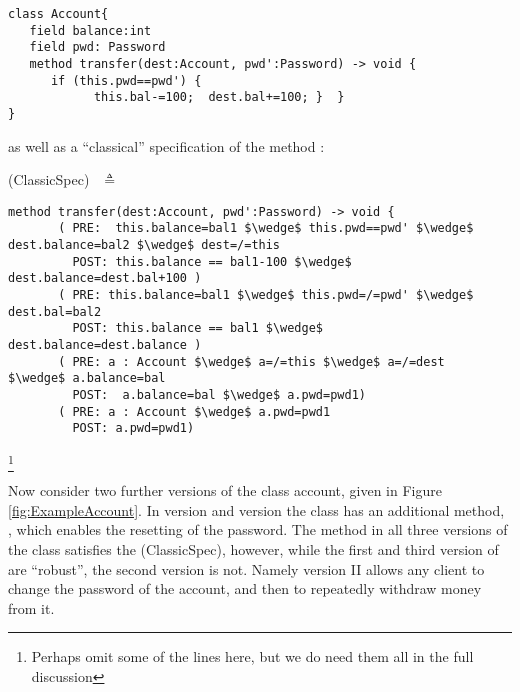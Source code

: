  

\begin{lstlisting}
class Account{
   field balance:int 
   field pwd: Password 
   method transfer(dest:Account, pwd':Password) -> void {
      if (this.pwd==pwd') {
            this.bal-=100;  dest.bal+=100; }  }
}
\end{lstlisting}

as well as a ``classical'' specification of the method :

 (ClassicSpec)$  \ \ $  $\triangleq$

\begin{lstlisting}[mathescape=true, frame=lines]
  method transfer(dest:Account, pwd':Password) -> void {
       ( PRE:  this.balance=bal1 $\wedge$ this.pwd==pwd' $\wedge$ dest.balance=bal2 $\wedge$ dest=/=this 
         POST: this.balance == bal1-100 $\wedge$  dest.balance=dest.bal+100 )
       ( PRE: this.balance=bal1 $\wedge$ this.pwd=/=pwd' $\wedge$ dest.bal=bal2
         POST: this.balance == bal1 $\wedge$  dest.balance=dest.balance )
       ( PRE: a : Account $\wedge$ a=/=this $\wedge$ a=/=dest  $\wedge$ a.balance=bal  
         POST:  a.balance=bal $\wedge$ a.pwd=pwd1)
       ( PRE: a : Account $\wedge$ a.pwd=pwd1  
         POST: a.pwd=pwd1)       
\end{lstlisting}\footnote{Perhaps omit some of the lines here, but we do need them all in the full discussion}
 
  
 
 Now consider two further versions of the class account, given in Figure \ref{fig:ExampleAccount}.
 In version {} and version {} the class has an additional method, , which enables the resetting of the password.
The method  in all three versions of the class  satisfies the (ClassicSpec), 
however, while the first and third version of  are ``robust'', the second version is not.
Namely version II allows any client to change the password of the account, and then to repeatedly withdraw 
money from it.
  
%
  
